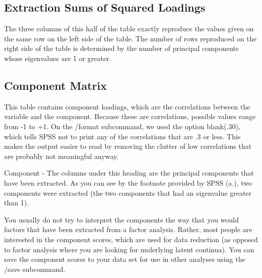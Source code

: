 \documentclass[a4paper,12pt]{article}
\begin{document}




\subsection{Extraction Sums of Squared Loadings}

The three columns of this half of the table exactly reproduce the values given on the same row on the left side of the table.  The number of rows reproduced on the right side of the table is determined by the number of principal components whose eigenvalues are 1 or greater.

\subsection{Component Matrix} This table contains component loadings, which are the correlations between the variable and the component.  Because these are correlations, possible values range from -1 to +1.  On the /format subcommand, we used the option blank(.30), which tells SPSS not to print any of the correlations that are .3 or less.  This makes the output easier to read by removing the clutter of low correlations that are probably not meaningful anyway.

Component - The columns under this heading are the principal components that have been extracted.  As you can see by the footnote provided by SPSS (a.), two components were extracted (the two components that had an eigenvalue greater than 1).

You usually do not try to interpret the components the way that you would factors that have been extracted from a factor analysis.  Rather, most people are interested in the component scores, which are used for data reduction (as opposed to factor analysis where you are looking for underlying latent continua).  You can save the component scores to your data set for use in other analyses using the /save subcommand.
\end{document}
